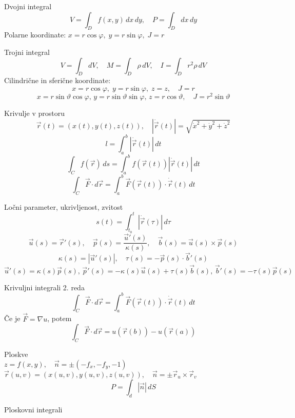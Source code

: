 \documentclass[a4paper,10pt]{article}
\begin{document}
\begin{multicols}{2}
\begin{formulaBox}{Dvojni integral}
\[
V=\int_D f(x,y)\,dx\,dy, \quad P=\int_D dx\,dy
\]
Polarne koordinate: $x=r\cos\varphi,\; y=r\sin\varphi,\; J = r$
\end{formulaBox}

\begin{formulaBox}{Trojni integral}
\[
V=\int_D dV, \quad M=\int_D \rho\,dV, \quad I=\int_D r^2\rho\,dV
\]
Cilindrične in sferične koordinate:
\[
x=r\cos\varphi,\; y=r\sin\varphi,\; z=z,\quad J=r
\]
\[
x=r\sin\vartheta\cos\varphi,\, y=r\sin\vartheta\sin\varphi,\, z=r\cos\vartheta,\quad J=r^2\sin\vartheta
\]
\end{formulaBox}

\begin{formulaBox}{Krivulje v prostoru}
\[
\vec r(t)=(x(t),y(t),z(t)),\quad |\dot{\vec r}(t)|=\sqrt{\dot{x}^2+\dot{y}^2+\dot{z}^2}
\]
\[
l=\int_a^b |\dot{\vec r}(t)|\,dt
\]
\[
\int_C f(\vec r)\,ds = \int_a^b f(\vec r(t))|\dot{\vec r}(t)|\,dt
\]
\[
\int_C \vec F\cdot d\vec r = \int_a^b \vec F(\vec r(t))\cdot \dot{\vec r}(t)\,dt
\]
\end{formulaBox}

\begin{formulaBox}{Ločni parameter, ukrivljenost, zvitost}
\[
s(t)=\int_{t_0}^t|\dot{\vec r}(\tau)|\,d\tau
\]
\[\vec{u}(s)=\vec{r}'(s),\quad \vec{p}(s)=\frac{\vec{u}'(s)}{\kappa(s)},\quad \vec{b}(s)=\vec{u}(s)\times \vec{p}(s)\]
\[\kappa(s)=|\vec{u}'(s)|,\quad \tau(s)=-\vec{p}(s)\cdot \vec{b}'(s)\]
\[\vec{u}'(s)= \kappa(s)\vec{p}(s), \, \vec{p}'(s) = -\kappa(s)\vec{u}(s) + \tau(s)\vec{b}(s), \, \vec{b}'(s) = -\tau(s)\vec{p}(s)\]
\end{formulaBox}

\begin{formulaBox}{Krivuljni integrali 2. reda}
\[
\int_C \vec F\cdot d\vec r = \int_a^b \vec F(\vec r(t))\cdot \dot{\vec r}(t)\,dt
\]
Če je $\vec F=\nabla u$, potem
\[
\int_C \vec F\cdot d\vec r = u(\vec r(b))-u(\vec r(a))
\]
\end{formulaBox}

\begin{formulaBox}{Ploskve}
	\\
$z=f(x,y),\quad \vec{n}=\pm(-f_x,-f_y,-1)$\\
$\vec r(u,v)=(x(u,v),y(u,v),z(u,v)),\quad \vec n=\pm\vec r_u\times \vec r_v$
\[P=\int_d|\vec{n}|\,dS\]
\end{formulaBox}

\begin{formulaBox}{Ploskovni integrali}


\end{formulaBox}
\end{multicols}
\end{document}
